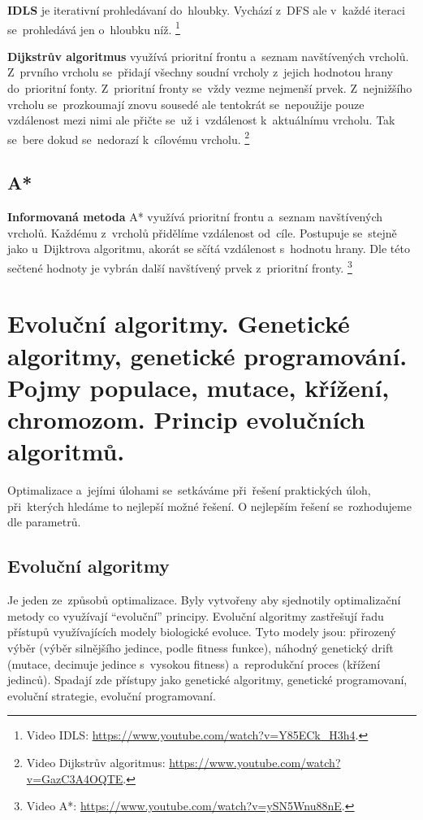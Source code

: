 \textbf{IDLS} je iterativní prohledávaní do~hloubky. Vychází z~DFS ale v~každé iteraci se~prohledává jen o~hloubku níž.%
\footnote{Video IDLS: \url{https://www.youtube.com/watch?v=Y85ECk_H3h4}.}

\textbf{Dijkstrův algoritmus} využívá prioritní frontu a~seznam navštívených vrcholů. Z~prvního vrcholu se~přidají všechny soudní vrcholy z~jejich hodnotou hrany do~prioritní fonty. Z~prioritní fronty se~vždy vezme nejmenší prvek. Z~nejnižšího vrcholu se~prozkoumají znovu sousedé ale tentokrát se~nepoužije pouze vzdálenost mezi nimi ale přičte se~už i~vzdálenost k~aktuálnímu vrcholu. Tak se~bere dokud se~nedorazí k~cílovému vrcholu.%
\footnote{Video Dijkstrův algoritmus: \url{https://www.youtube.com/watch?v=GazC3A4OQTE}.}

\subsection{A*}

\textbf{Informovaná metoda} A* využívá prioritní frontu a~seznam navštívených vrcholů. Každému z~vrcholů přidělíme vzdálenost od~cíle. Postupuje se~stejně jako u~Dijktrova algoritmu, akorát se sčítá vzdálenost s~hodnotu hrany. Dle této sečtené hodnoty je vybrán další navštívený prvek z~prioritní fronty.%
\footnote{Video A*: \url{https://www.youtube.com/watch?v=ySN5Wnu88nE}.}

\clearpage
\section{Evoluční algoritmy. Genetické algoritmy, genetické programování. Pojmy populace, mutace, křížení, chromozom. Princip evolučních algoritmů.}

Optimalizace a~jejími úlohami se~setkáváme při~řešení praktických úloh, při~kterých hledáme to nejlepší možné řešení. O nejlepším řešení se~rozhodujeme dle parametrů.

\subsection{Evoluční algoritmy}

Je jeden ze~způsobů optimalizace. Byly vytvořeny aby sjednotily optimalizační metody co využívají \enquote{evoluční} principy. Evoluční algoritmy zastřešují řadu přístupů využívajících modely biologické evoluce. Tyto modely jsou: přirozený výběr (výběr silnějšího jedince, podle fitness funkce), náhodný genetický drift (mutace, decimuje jedince s~vysokou fitness) a~reprodukční proces (křížení jedinců). Spadají zde přístupy jako genetické algoritmy, genetické programovaní, evoluční strategie, evoluční programovaní.

